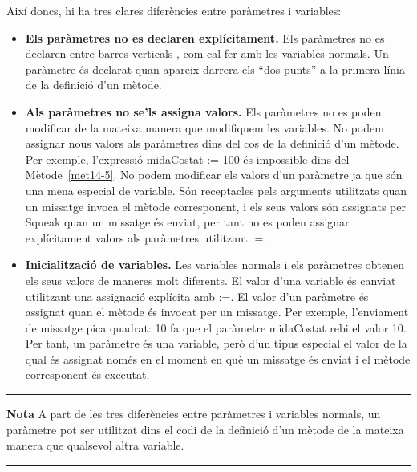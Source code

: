 Així doncs, hi ha tres clares diferències entre paràmetres i variables:     
\begin{itemize}
\item[] \textbf{Els paràmetres no es declaren explícitament.} Els paràmetres no es declaren entre barres verticals \textbar \hspace{2mm} \textbar , com cal fer amb les variables normals. Un paràmetre és declarat quan apareix darrera els ``dos punts'' a la primera línia de la definició d'un mètode.
\item[] \textbf{Als paràmetres no se'ls assigna valors.} Els paràmetres no es poden modificar de la mateixa manera que modifiquem les variables. No podem assignar nous valors als paràmetres dins del cos de la definició d'un mètode. Per exemple, l'expressió \textsf{midaCostat := 100} és impossible dins del Mètode~\ref{met14-5}. No podem modificar els valors d'un paràmetre ja que són una mena especial de variable. Són receptacles pels arguments utilitzats quan un missatge invoca el mètode corresponent, i els seus valors són assignats per Squeak quan un missatge és enviat, per tant no es poden assignar explícitament valors als paràmetres utilitzant \textsf{:=}.
\item[] \textbf{Inicialització de variables.} Les variables normals i els paràmetres obtenen els seus valors de maneres molt diferents. El valor d'una variable és canviat utilitzant una assignació explícita amb \textsf{:=}. El valor d'un paràmetre és assignat quan el mètode és invocat per un missatge. Per exemple, l'enviament de missatge \textsf{pica quadrat: 10} fa que el paràmetre \textsf{midaCostat} rebi el valor \textsf{10}. Per tant, un paràmetre és una variable, però d'un tipus especial el valor de la qual és assignat només en el moment en què un missatge és enviat i el mètode corresponent és executat. 
\end{itemize}

\noindent
\rule{\textwidth}{2pt}
\noindent
\textbf{Nota} A part de les tres diferències entre paràmetres i variables normals, un paràmetre pot ser utilitzat dins el codi de la definició d'un mètode de la mateixa manera que qualsevol altra variable.
\\
\noindent
\rule{\textwidth}{2pt}

